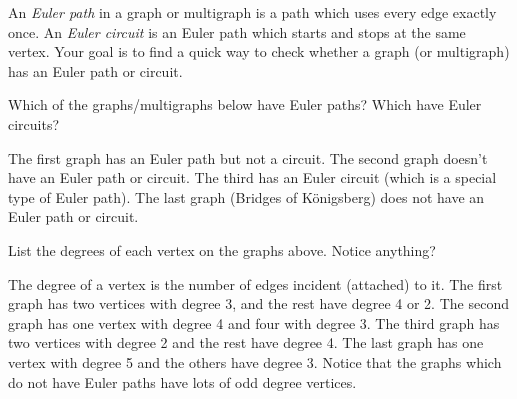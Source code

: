 \documentclass[11pt]{exam}
\newcommand{\vtx}[2]{node[fill,circle,inner sep=0pt, minimum size=7pt,label=#1:#2]{}}
\renewcommand{\v}{\vtx{above}{}}
\begin{document}

\noindent An \emph{Euler path} in a graph or multigraph is a path which uses every edge exactly once.  An \emph{Euler circuit} is an Euler path which starts and stops at the same vertex.  Your goal is to find a quick way to check whether a graph (or multigraph) has an Euler path or circuit.

\begin{questions}
\question Which of the graphs/multigraphs below have Euler paths?  Which have Euler circuits?


\begin{center}
\hfill
\hfill
\hfill
{}

\end{center}

\begin{solution}
The first graph has an Euler path but not a circuit.  The second graph doesn't have an Euler path or circuit. The third has an Euler circuit (which is a special type of Euler path).  The last graph (Bridges of K\"onigsberg) does not have an Euler path or circuit.
\end{solution}


\vfill
\question List the degrees of each vertex on the graphs above.  Notice anything?

\begin{solution}
The degree of a vertex is the number of edges incident (attached) to it.  The first graph has two vertices with degree 3, and the rest have degree 4 or 2.  The second graph has one vertex with degree 4 and four with degree 3.  The third graph has two vertices with degree 2 and the rest have degree 4.  The last graph has one vertex with degree 5 and the others have degree 3.  Notice that the graphs which do not have Euler paths have lots of odd degree vertices.
\end{solution}



\end{questions}
\end{document}
